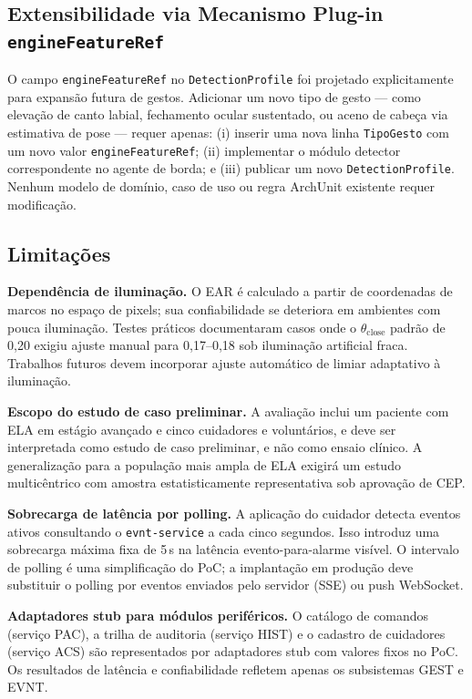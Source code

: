 \subsection{Extensibilidade via Mecanismo Plug-in \texttt{engineFeatureRef}}

O campo \texttt{engineFeatureRef} no \texttt{DetectionProfile} foi projetado
explicitamente para expansão futura de gestos. Adicionar um novo tipo de gesto —
como elevação de canto labial, fechamento ocular sustentado, ou aceno de cabeça via
estimativa de pose — requer apenas: (i) inserir uma nova linha \texttt{TipoGesto}
com um novo valor \texttt{engineFeatureRef}; (ii) implementar o módulo detector
correspondente no agente de borda; e (iii) publicar um novo \texttt{DetectionProfile}.
Nenhum modelo de domínio, caso de uso ou regra ArchUnit existente requer modificação.

\subsection{Limitações}

\textbf{Dependência de iluminação.} O EAR é calculado a partir de coordenadas de
marcos no espaço de pixels; sua confiabilidade se deteriora em ambientes com pouca
iluminação. Testes práticos documentaram casos onde o $\theta_\text{close}$ padrão de
0,20 exigiu ajuste manual para 0,17--0,18 sob iluminação artificial fraca. Trabalhos
futuros devem incorporar ajuste automático de limiar adaptativo à iluminação.

\textbf{Escopo do estudo de caso preliminar.} A avaliação inclui um paciente com ELA
em estágio avançado e cinco cuidadores e voluntários, e deve ser interpretada como
estudo de caso preliminar, e não como ensaio clínico. A generalização para a população
mais ampla de ELA exigirá um estudo multicêntrico com amostra estatisticamente
representativa sob aprovação de CEP.

\textbf{Sobrecarga de latência por polling.} A aplicação do cuidador detecta eventos
ativos consultando o \texttt{evnt-service} a cada cinco segundos. Isso introduz uma
sobrecarga máxima fixa de 5\,s na latência evento-para-alarme visível. O intervalo de
polling é uma simplificação do PoC; a implantação em produção deve substituir o polling
por eventos enviados pelo servidor (SSE) ou push WebSocket.

\textbf{Adaptadores stub para módulos periféricos.} O catálogo de comandos (serviço
PAC), a trilha de auditoria (serviço HIST) e o cadastro de cuidadores (serviço ACS)
são representados por adaptadores stub com valores fixos no PoC. Os resultados de
latência e confiabilidade refletem apenas os subsistemas GEST e EVNT.

